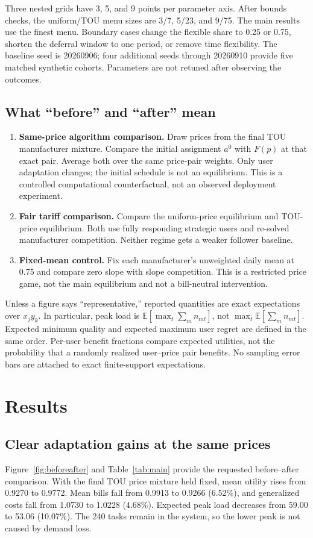 \documentclass[11pt,a4paper]{article}
\newcommand{\E}{\mathbb{E}}
\begin{document}
Three nested grids have 3, 5, and 9 points per parameter axis. After bounds checks, the uniform/TOU menu sizes are 3/7, 5/23, and 9/75. The main results use the finest menu. Boundary cases change the flexible share to 0.25 or 0.75, shorten the deferral window to one period, or remove time flexibility. The baseline seed is 20260906; four additional seeds through 20260910 provide five matched synthetic cohorts. Parameters are not retuned after observing the outcomes.

\subsection{What ``before'' and ``after'' mean}
\begin{enumerate}[leftmargin=*]
\item \textbf{Same-price algorithm comparison.} Draw prices from the final TOU manufacturer mixture. Compare the initial assignment $a^0$ with $F(p)$ at that exact pair. Average both over the same price-pair weights. Only user adaptation changes; the initial schedule is not an equilibrium. This is a controlled computational counterfactual, not an observed deployment experiment.
\item \textbf{Fair tariff comparison.} Compare the uniform-price equilibrium and TOU-price equilibrium. Both use fully responding strategic users and re-solved manufacturer competition. Neither regime gets a weaker follower baseline.
\item \textbf{Fixed-mean control.} Fix each manufacturer's unweighted daily mean at 0.75 and compare zero slope with slope competition. This is a restricted price game, not the main equilibrium and not a bill-neutral intervention.
\end{enumerate}
Unless a figure says ``representative,'' reported quantities are exact expectations over $x_jy_k$. In particular, peak load is $\E[\max_t\sum_m n_{mt}]$, not $\max_t\E[\sum_m n_{mt}]$. Expected minimum quality and expected maximum user regret are defined in the same order. Per-user benefit fractions compare expected utilities, not the probability that a randomly realized user--price pair benefits. No sampling error bars are attached to exact finite-support expectations.

\section{Results}
\subsection{Clear adaptation gains at the same prices}
Figure~\ref{fig:beforeafter} and Table~\ref{tab:main} provide the requested before--after comparison. With the final TOU price mixture held fixed, mean utility rises from 0.9270 to 0.9772. Mean bills fall from 0.9913 to 0.9266 (6.52\%), and generalized costs fall from 1.0730 to 1.0228 (4.68\%). Expected peak load decreases from 59.00 to 53.06 (10.07\%). The 240 tasks remain in the system, so the lower peak is not caused by demand loss.
\end{document}
